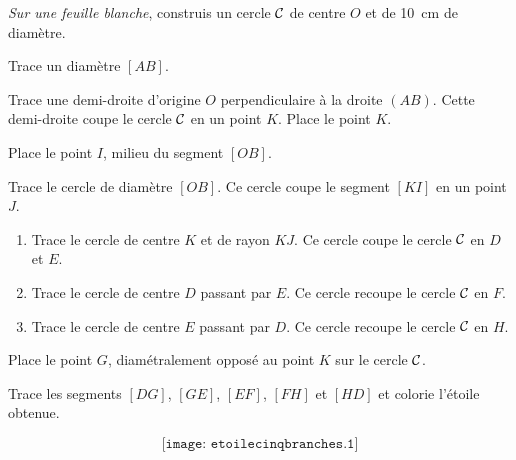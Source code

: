 \begin{myenumerate}
  \item {\em Sur une feuille blanche}, construis un cercle $\cal C$ de centre $O$ et de 10~cm de diamètre.
  \item Trace un diamètre $[AB]$.
  \item Trace une demi-droite d'origine $O$ perpendiculaire à la droite $(AB)$. Cette demi-droite coupe le cercle $\cal C$ en un point $K$. Place le point $K$.
  \item Place le point $I$, milieu du segment $[OB]$.
  \item Trace le cercle de diamètre $[OB]$. Ce cercle coupe le segment $[KI]$ en un point $J$.
  \item 
    \begin{enumerate}
    \item Trace le cercle de centre $K$ et de rayon $KJ$. Ce cercle coupe le cercle $\cal C$ en $D$ et $E$.
    \item Trace le cercle de centre $D$ passant par $E$. Ce cercle recoupe le cercle $\cal C$ en $F$.
    \item Trace le cercle de centre $E$ passant par $D$. Ce cercle recoupe le cercle $\cal C$ en $H$.
    \end{enumerate}
  \item Place le point $G$, diamétralement opposé au point $K$ sur le cercle $\cal C$.
  \item Trace les segments $[DG]$, $[GE]$, $[EF]$, $[FH]$ et $[HD]$ et colorie l'étoile obtenue.
\end{myenumerate}
\[\texttt{[image: etoilecinqbranches.1]}\]